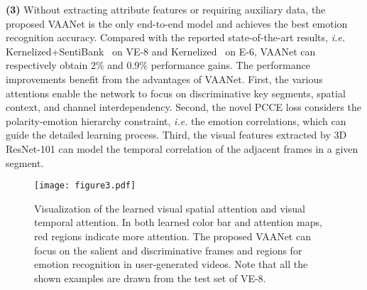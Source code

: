 \documentclass[letterpaper]{article} \usepackage{aaai20}  \usepackage{times}  \usepackage{helvet} \usepackage{courier}  \usepackage[hyphens]{url}  \usepackage{graphicx} \urlstyle{rm} \def\UrlFont{\rm}  \usepackage{graphicx}
\begin{document}
\textbf{(3)} Without extracting attribute features or requiring auxiliary data, the proposed VAANet is the only end-to-end model and achieves the best emotion recognition accuracy. Compared with the reported state-of-the-art results, \textit{i.e.}  Kernelized+SentiBank~\cite{zhang2018recognition} on VE-8 and Kernelized~\cite{zhang2018recognition} on E-6, VAANet can respectively obtain 2\% and 0.9\% performance gains. The performance improvements benefit from the advantages of VAANet. First, the various attentions enable the network to focus on discriminative key segments, spatial context, and channel interdependency. Second, the novel PCCE loss considers the polarity-emotion hierarchy constraint, \textit{i.e.} the emotion correlations, which can guide the detailed learning process. Third, the visual features extracted by 3D ResNet-101 can model the temporal correlation of the adjacent frames in a given segment.



\begin{figure*}[!t]
\begin{center}
\centering \texttt{[image: figure3.pdf]}
\caption{Visualization of the learned visual spatial attention and visual temporal attention. In both learned color bar and attention maps, red regions indicate more attention. The proposed VAANet can focus on the salient and discriminative frames and regions for emotion recognition in user-generated videos. Note that all the shown examples are drawn from the test set of VE-8. }
\label{fig:heatmap}
\end{center}
\end{figure*}
\end{document}
